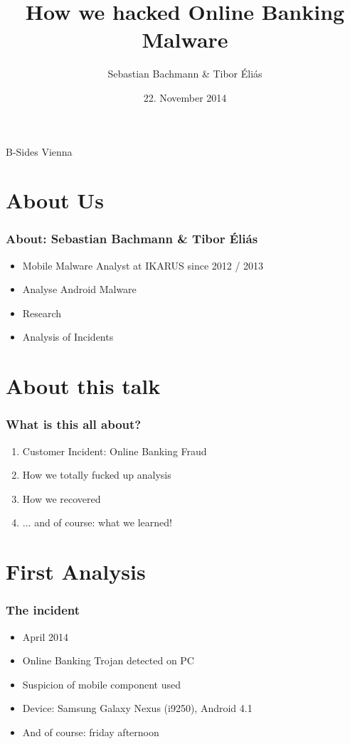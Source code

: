 \documentclass[12pt,a4paper]{beamer}
\author{Sebastian Bachmann \& Tibor Éliás}
\title{How we hacked Online Banking Malware}
\date{22. November 2014}
\begin{document}
\begin{frame}
    \maketitle
    \centering
    B-Sides Vienna
\end{frame}


\section{About Us}
\begin{frame}
	\frametitle{About: Sebastian Bachmann \& Tibor Éliás}
	\begin{itemize}
		\item Mobile Malware Analyst at IKARUS since 2012 / 2013
		\item Analyse Android Malware
		\item Research
		\item Analysis of Incidents
	\end{itemize}
\end{frame}

\section{About this talk}
\begin{frame}
	\frametitle{What is this all about?}
	\begin{enumerate}
	
		\item Customer Incident: Online Banking Fraud
		\item How we totally fucked up analysis
		\item How we recovered
		\item ... and of course: what we learned!
	\end{enumerate}
\end{frame}


\section{First Analysis}

\begin{frame}
	\frametitle{The incident}
	
	\begin{itemize}
		\item April 2014
		\item Online Banking Trojan detected on PC
		\item Suspicion of mobile component used
		\item Device: Samsung Galaxy Nexus (i9250), Android 4.1
		\item And of course: friday afternoon
	\end{itemize}

\end{frame}
\end{document}
